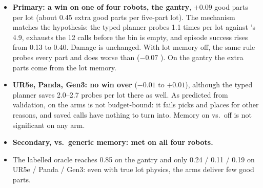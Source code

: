 \begin{table}[!htbp]
  \centering\small
  \setlength{\tabcolsep}{3.5pt}
  \caption{Round 5, pre-registered: good parts per lot (5 parts, 12 shared calls, $n = 30$ paired lots per
  robot). Primary endpoint: typed $-$ \pta. Bold: CI above 0.}
  \label{tab:r8}
\end{table}

\begin{itemize}
  \item \textbf{Primary: a win on one of four robots, the gantry}, $+0.09$  good parts per lot
        (about 0.45 extra good parts per five-part lot). The mechanism matches the hypothesis: the typed planner
        probes 1.1 times per lot against \pta's 4.9, \pta{} exhausts the 12 calls before the bin is empty, and
        episode success rises from 0.13 to 0.40. Damage is unchanged. With lot memory off, the same rule probes
        every part and does worse than \pta{} ($-0.07$ ). On the gantry the extra parts come
        from the lot memory.
  \item \textbf{UR5e, Panda, Gen3: no win over \pta{}} ($-0.01$ to $+0.01$), although the typed planner saves
        2.0--2.7 probes per lot there as well. As predicted from validation, \pta{} on the arms is not
        budget-bound: it fails picks and places for other reasons, and saved calls have nothing to turn into.
        Memory on vs.\ off is not significant on any arm.
  \item \textbf{Secondary, vs.\ generic memory: met on all four robots.}
  \item The labelled oracle reaches 0.85 on the gantry and only 0.24 / 0.11 / 0.19 on UR5e / Panda / Gen3:
        even with true lot physics, the arms deliver few good parts.
\end{itemize}

